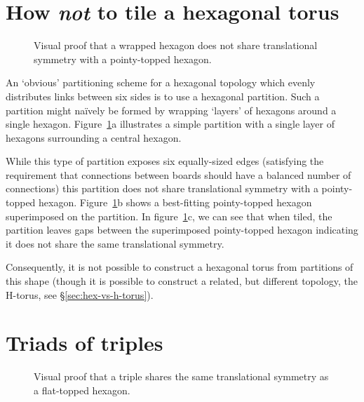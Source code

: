 	
	\section{How \emph{not} to tile a hexagonal torus}
		
		\begin{figure}
			\center
			
			\caption{Visual proof that a wrapped hexagon does not share translational
			symmetry with a pointy-topped hexagon.}
			\label{fig:wrapped-hexagon-tiling}
		\end{figure}
	
		An `obvious' partitioning scheme for a hexagonal topology which evenly
		distributes links between six sides is to use a hexagonal partition. Such a
		partition might na\"ively be formed by wrapping `layers' of hexagons around a
		single hexagon. Figure~\ref{fig:wrapped-hexagon-tiling}a illustrates a
		simple partition with a single layer of hexagons surrounding a central
		hexagon.
	
		While this type of partition exposes six equally-sized edges (satisfying
		the requirement that connections between boards should have a balanced
		number of connections) this partition does not share translational symmetry
		with a pointy-topped hexagon. Figure~\ref{fig:wrapped-hexagon-tiling}b
		shows a best-fitting pointy-topped hexagon superimposed on the partition.
		In figure~\ref{fig:wrapped-hexagon-tiling}c, we can see that when tiled,
		the partition leaves gaps between the superimposed pointy-topped hexagon
		indicating it does not share the same translational symmetry.
		
		Consequently, it is not possible to construct a hexagonal torus from
		partitions of this shape (though it is possible to construct a related, but
		different topology, the H-torus, see \S\ref{sec:hex-vs-h-torus}).
	
	\section{Triads of triples}
		
		\begin{figure}
			\center
			
			\caption{Visual proof that a triple shares the same translational
			symmetry as a flat-topped hexagon.}
			\label{fig:wrapped-triple-tiling}
		\end{figure}
		
